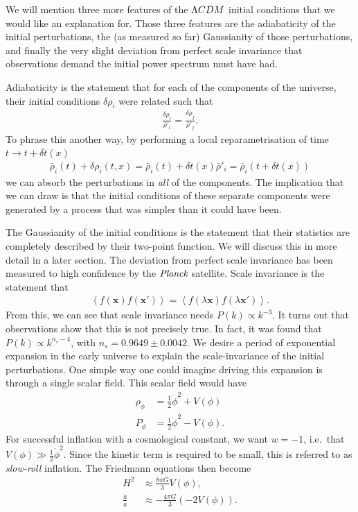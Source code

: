     We will mention three more features of the $\Lambda CDM$ initial conditions that we would
    like an explanation for. Those three features are the adiabaticity of the initial
    perturbations, the (as measured so far) Gaussianity of those perturbations, and finally
    the very slight deviation from perfect scale invariance that observations demand the
    initial power spectrum must have had.


    Adiabaticity is the statement that for each of the components of the universe, their
    initial conditions $\delta\rho_i$ were related such that
    \begin{align}
        \frac{\delta\rho_i}{\bar{\rho}'_i} = \frac{\delta\rho_j}{\bar{\rho}'_j}.
    \end{align}
    To phrase this another way, by performing a local reparametrisation of time $t\rightarrow t+\delta t(x)$
    \begin{align}
        \bar{\rho}_i(t)+\delta \rho_i(t,x) = \bar{\rho}_i(t)+\delta t(x)\bar{\rho}'_i
        = \bar{\rho}_i(t+\delta t(x))
    \end{align}
    we can absorb the perturbations in \textit{all} of the components. The implication that we can draw
    is that the initial conditions of these separate components were generated by a process that was simpler than
    it could have been.


    The Gaussianity of the initial conditions is the statement that their statistics are completely described by
    their two-point function. We will discuss this in more detail in a later section.
    The deviation from perfect scale invariance has been measured to high confidence by the $\textit{Planck}$
    satellite. Scale invariance is the statement that
    \begin{align}
        \left<f(\mathbf{x})f(\mathbf{x'})\right> = \left<f(\lambda\mathbf{x})f(\lambda\mathbf{x'})\right>.
    \end{align}
    From this, we can see that scale invariance needs $P(k)\propto k^{-3}$.
    It turns out that observations show that this is not precisely true.
    In fact, it was found that $P(k)\propto k^{n_s-4}$, with $n_s=0.9649 \pm 0.0042$.
\newpage
    We desire a period of exponential expansion in the early universe to explain the
    scale-invariance of the initial perturbations.
    One simple way one could imagine driving this expansion is through a single
    scalar field. This scalar field would have
    \begin{align}
        \rho_\phi &= \frac{1}{2}\dot{\phi}^2+V(\phi)\\
        P_\phi &= \frac{1}{2}\dot{\phi}^2-V(\phi).
    \end{align}
    For successful inflation with a cosmological constant, we want $w=-1$,
    i.e.\ that $V(\phi)\gg\frac{1}{2}\dot{\phi}^2$. Since the kinetic term is required to
    be small, this is referred to as \textit{slow-roll} inflation.
    The Friedmann equations then become
    \begin{align}
        H^2 &\approx \frac{8\pi G}{3}V(\phi),\\
        \frac{\ddot{a}}{a} &\approx -\frac{4\pi G}{3}\left(-2V(\phi)\right).
    \end{align}
\newpage
